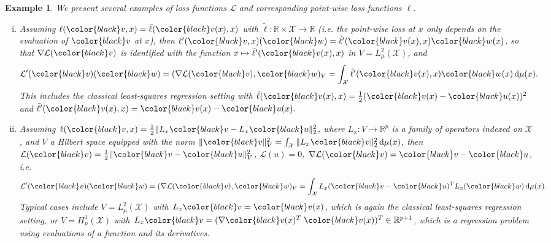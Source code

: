 \documentclass{article}
\theoremstyle{noparens}
\newtheorem{example}{Example}[section]
\newcommand{\cL}{\mathcal{L}}
\newcommand{\cX}{\mathcal{X}}
\newcommand{\dd}{\mathrm{d}}
\newcommand{\colorV}{\color{black}}
\newcommand{\colorM}{\color{black}}
\renewcommand{\u}{{\colorV u}}
\newcommand{\w}{{\colorM w}}
\renewcommand{\v}{{\colorM v}}
\begin{document}
\vspace{10pt}
\begin{example}\label{ex:examples_loss}
We present several examples of
      {loss} functions $\cL$ and corresponding  {point-wise loss} functions $\ell$.
    \begin{enumerate}[(i)]
        \item Assuming $\ell(\v , x) = \tilde \ell(\v(x) , x)$ with $\tilde \ell : \mathbb{R} \times \cX \to \mathbb{R}$ (i.e. the point-wise loss at $x$ only depends on the  evaluation of $\v$ at $x$), then $\ell'(\v , x) (\w) = \tilde \ell'(\v(x) , x) \w(x)$, so that $\nabla \cL(\v)$ is identified with the function $x\mapsto  \tilde \ell'(\v(x) , x)$ in $V= L^2_\mu(\cX)$, and
\begin{align}
\cL'(\v)(\w)=(\nabla \cL(\v) , \w)_V &= \int_\cX  \tilde \ell'(\v(x), x) \w(x) \,  \dd \mu(x) .
\end{align}
This includes the classical least-squares regression setting with $\tilde \ell(\v(x) , x) = \frac{1}{2}(\v(x) - \u(x))^2$ and $\tilde \ell'(\v(x) , x) = \v(x) - \u(x).$
    \item Assuming $\ell(\v , x) = \frac{1}{2} \Vert L_x \v - L_x \u \Vert_2^2$, where $L_x : V \to \mathbb{R}^p$ is a family of operators indexed on $\cX$, and $V$ a Hilbert space  equipped with the norm
      $\Vert \v \Vert_V^2 = \int_\cX \Vert L_x \v \Vert_2^2 \, \dd \mu(x)$, then $\cL(\v) =\frac{1}{2} \Vert \v - \u \Vert_V^2$, $\cL(u) = 0$,  $\nabla \cL(\v) = \v - \u $, i.e.
      $$
    \cL'(\v)(\w)=(\nabla \cL(\v) , \w)_V = \int_{\cX} L_x (\v - \u)^T L_x(\w) \,  \dd \mu(x) .
      $$
      Typical cases include $V = L^2_\mu(\cX)$ with $L_x \v = \v(x)$, which is again the classical least-squares regression setting, or $V = H^1_\mu(\cX)$ with $L_x \v = (\nabla \v(x)^T \;  \v(x) )^T \in \mathbb{R}^{p+1}$, which is a regression problem using evaluations of a function and its derivatives.


\end{enumerate}
\end{example}
\end{document}
